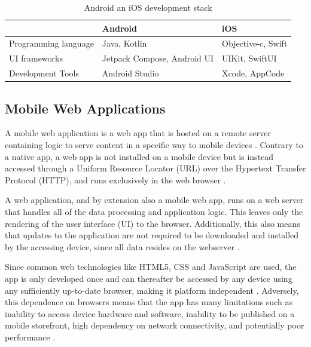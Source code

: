 \documentclass[a4paper,12pt]{article}
\begin{document}
\begin{table}[h]
\centering
{}
\begin{tabular}{|l|l|l|}
\hline
\rowcolor[HTML]{656565}
\multicolumn{1}{|c|}{\cellcolor[HTML]{656565}} & {\color[HTML]{FFFFFF} Android} & {\color[HTML]{FFFFFF} iOS} \\ \hline
Programming language & Java, Kotlin & Objective-c, Swift \\
UI frameworks & Jetpack Compose, Android UI & UIKit, SwiftUI \\
Development Tools & Android Studio & Xcode, AppCode \\ \hline
\end{tabular}
\caption{Android an iOS development stack \cite{mobile_tech_stacks}}
\label{tab:devstack}
\end{table}

\subsection{Mobile Web Applications}
\label{Theory_mobileWebApps}
A mobile web application is a web app that is hosted on a remote server containing logic to serve content in a specific way to mobile devices \cite{crossplatform_2012, mobile_web_apps_2013}. Contrary to a native app, a web app is not installed on a mobile device but is instead accessed through a Uniform Resource Locator (URL) over the Hypertext Transfer Protocol (HTTP), and runs exclusively in the web browser \cite{crossplatform_taxonomy, crossplatform_2012}.

A web application, and by extension also a mobile web app, runs on a web server that handles all of the data processing and application logic. This leaves only the rendering of the user interface (UI) to the browser. Additionally, this also means that updates to the application are not required to be downloaded and installed by the accessing device, since all data resides on the webserver \cite{crossplatform_taxonomy, crossplatform_2012}.

Since common web technologies like HTML5, CSS and JavaScript are used, the app is only developed once and can thereafter be accessed by any device using any sufficiently up-to-date browser, making it platform independent \cite{crossplatform_taxonomy}. Adversely, this dependence on browsers means that the app has many limitations such as  inability to access device hardware and software, inability to be published on a mobile storefront, high dependency on network connectivity, and potentially poor performance \cite{crossplatform_taxonomy, crossplatform_2012}.
\end{document}
